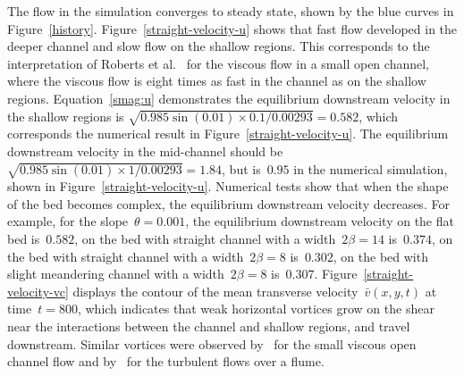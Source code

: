 \documentclass[a5paper,12pt]{article}
\newcommand{\vv}{{\bar v}}
\begin{document}
The flow in the simulation converges to steady state, shown by the blue curves in Figure~\ref{history}.
Figure~\ref{straight-velocity-u} shows that fast flow developed in the deeper channel and slow flow on the shallow regions.
This corresponds to the interpretation of Roberts et al.~\cite{Robertsli2006} for the viscous flow in a small open channel, where the viscous flow is eight times as fast in the channel as on the shallow regions. 
Equation~\eqref{smag:u} demonstrates the equilibrium downstream velocity in the shallow regions is $\sqrt{0.985\sin(0.01)\times0.1/0.00293}=0.582$, which corresponds the numerical result in Figure~\ref{straight-velocity-u}. 
The equilibrium downstream velocity in the mid-channel should be $\sqrt{0.985\sin(0.01)\times1/0.00293}=1.84$, but is~$0.95$ in the numerical simulation, shown in Figure~\ref{straight-velocity-u}. 
Numerical tests show that when the shape of the bed becomes complex, the equilibrium downstream velocity decreases. 
For example, for the slope~$\theta=0.001$, the equilibrium downstream velocity on the flat bed is~$0.582$, on the bed with straight channel with a width~$2\beta=14$ is~$0.374$, on the bed with straight channel with a width~$2\beta=8$ is~$0.302$, on the bed with slight meandering channel with a width~$2\beta=8$ is~$0.307$.
Figure~\ref{straight-velocity-vc} displays the contour of the mean transverse velocity~$\vv(x,y,t)$ at time~$t=800$, which indicates that weak horizontal vortices grow on the shear near the interactions between the channel and shallow regions, and travel downstream. 
Similar vortices were observed by~\cite{Robertsli2006} for the small viscous open channel flow and by~\cite{Bousmar2003a} for the turbulent flows over a flume. 
\end{document}

